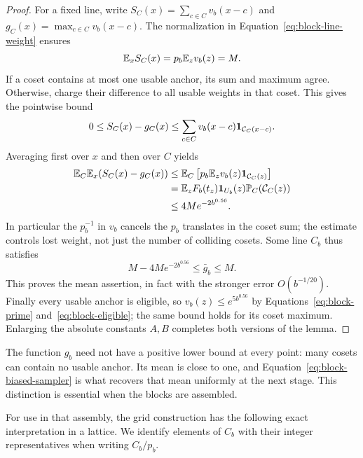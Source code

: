\begin{proof}
For a fixed line, write
$S_C(x)=\sum_{c\in C}v_b(x-c)$ and
$g_C(x)=\max_{c\in C}v_b(x-c)$.
The normalization in Equation~\eqref{eq:block-line-weight} ensures
\[
 \mathbb E_x S_C(x)=p_b\mathbb E_z v_b(z)=M.
\]
If a coset contains at most one usable anchor, its sum and maximum agree.
Otherwise, charge their difference to all usable weights in that coset.
This gives the pointwise bound
\[
 0\le S_C(x)-g_C(x)
       \le\sum_{c\in C}v_b(x-c)\mathbf 1_{\mathcal C_C(x-c)}.
\]
Averaging first over $x$ and then over $C$ yields
\begin{align}
 \mathbb E_C\mathbb E_x(S_C(x)-g_C(x))
 &\le\mathbb E_C\left[p_b\mathbb E_z v_b(z)\mathbf 1_{\mathcal C_C(z)}\right]\notag\\
 &=\mathbb E_zF_b(t_z)\mathbf 1_{U_b}(z)\mathbb P_C(\mathcal C_C(z))\notag\\
 &\le4M e^{-2b^{0.56}}.
 \label{eq:block-weighted-collision}
\end{align}
In particular the $p_b^{-1}$ in $v_b$ cancels the $p_b$ translates in the
coset sum; the estimate controls lost weight, not just the number of
colliding cosets.  Some line $C_b$ thus satisfies
\[
 M-4M e^{-2b^{0.56}}\le\bar g_b\le M.
\]
This proves the mean assertion, in fact with the stronger error
$O(b^{-1/20})$.  Finally every usable anchor is eligible, so
$v_b(z)\le e^{5b^{0.56}}$ by
Equations~\eqref{eq:block-prime} and~\eqref{eq:block-eligible}; the same
bound holds for its coset maximum.  Enlarging the absolute constants
$A,B$ completes both versions of the lemma.
\end{proof}

\begin{remark}
The function $g_b$ need not have a positive lower bound at every point:
many cosets can contain no usable anchor.  Its mean is close to one, and
Equation~\eqref{eq:block-biased-sampler} is what recovers that mean
uniformly at the next stage.  This distinction is essential when the
blocks are assembled.
\end{remark}

For use in that assembly, the grid construction has the following exact
interpretation in a lattice.  We identify elements of $C_b$ with their
integer representatives when writing $C_b/p_b$.

